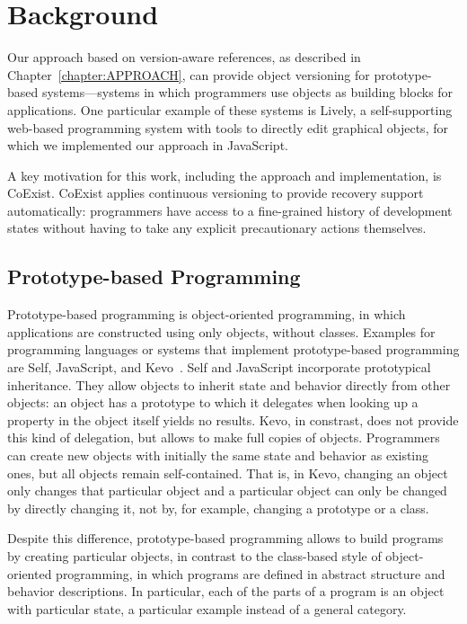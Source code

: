 \chapter{Background} \label{chapter:BACKGROUND}

Our approach based on version-aware references, as described in Chapter~\ref{chapter:APPROACH}, can provide object versioning for prototype-based systems---systems in which programmers use objects as building blocks for applications.
One particular example of these systems is Lively, a self-supporting web-based programming system with tools to directly edit graphical objects, for which we implemented our approach in JavaScript.

A key motivation for this work, including the approach and implementation, is CoExist.
CoExist applies continuous versioning to provide recovery support automatically: programmers have access to a fine-grained history of development states without having to take any explicit precautionary actions themselves.

\section{Prototype-based Programming}

Prototype-based programming is object-oriented programming, in which applications are constructed using only objects, without classes.
Examples for programming languages or systems that implement prototype-based programming are Self, JavaScript, and Kevo~\cite{Taivalsaari1992Kevo}.
Self and JavaScript incorporate prototypical inheritance.
They allow objects to inherit state and behavior directly from other objects: an object has a prototype to which it delegates when looking up a property in the object itself yields no results.
Kevo, in constrast, does not provide this kind of delegation, but allows to make full copies of objects.
Programmers can create new objects with initially the same state and behavior as existing ones, but all objects remain self-contained.
That is, in Kevo, changing an object only changes that particular object and a particular object can only be changed by directly changing it, not by, for example, changing a prototype or a class.

Despite this difference, prototype-based programming allows to build programs by creating particular objects, in contrast to the class-based style of object-oriented programming, in which programs are defined in abstract structure and behavior descriptions.
In particular, each of the parts of a program is an object with particular state, a particular example instead of a general category.

